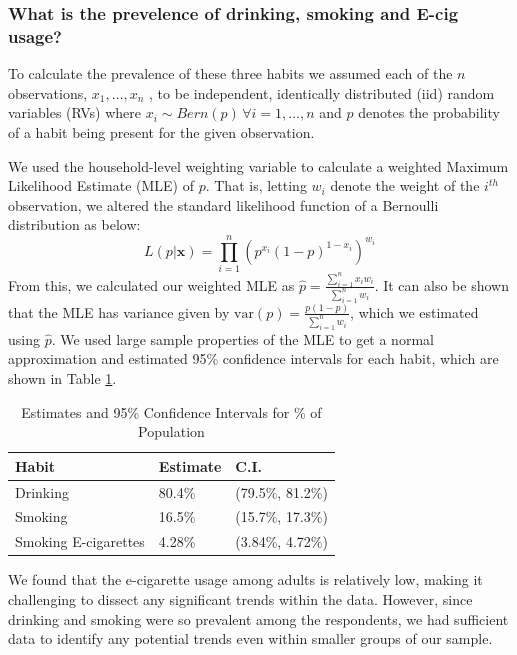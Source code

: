\documentclass[
  11pt,
  twocolumn]{article}
\begin{document}
\subsubsection{What is the prevelence of drinking, smoking and E-cig
usage?}\label{what-is-the-prevelence-of-drinking-smoking-and-e-cig-usage}

To calculate the prevalence of these three habits we assumed each of the
\(n\) observations, \(x_1,…,x_n\) , to be independent, identically
distributed (iid) random variables (RVs) where
\(x_i \sim Bern(p)\, \forall i=1,…,n\) and \(p\) denotes the probability
of a habit being present for the given observation.

We used the household-level weighting variable to calculate a weighted
Maximum Likelihood Estimate (MLE) of \(p\). That is, letting \(w_i\)
denote the weight of the \(i^{th}\) observation, we altered the standard
likelihood function of a Bernoulli distribution as below:
\[L(p|\textbf{x}) = \prod_{i = 1}^{n} (p^{x_i}(1-p)^{1-x_i})^{w_i}\]
From this, we calculated our weighted MLE as
\(\widehat{p} = \frac{\sum_{i=1}^{n} x_iw_i}{\sum_{i=1}^{n} w_i}\). It
can also be shown that the MLE has variance given by
\(\text{var}(p)=\frac{p(1-p)}{\sum_{i=1}^{n}w_i}\), which we estimated
using \(\widehat{p}\). We used large sample properties of the MLE to get
a normal approximation and estimated 95\% confidence intervals for each
habit, which are shown in Table \ref{tab:output-estimates-table}.

\begin{table}
\centering
\caption{\label{tab:outputestimatestable}Estimates and 95\% Confidence Intervals for \% of Population\label{tab:output-estimates-table}}
\centering
\fontsize{9}{11}\selectfont
\begin{tabular}[t]{l|l|l}
\hline
\textbf{Habit} & \textbf{Estimate} & \textbf{C.I.}\\
\hline
Drinking & 80.4\% & (79.5\%, 81.2\%)\\
\hline
Smoking & 16.5\% & (15.7\%, 17.3\%)\\
\hline
Smoking E-cigarettes & 4.28\% & (3.84\%, 4.72\%)\\
\hline
\end{tabular}
\end{table}

We found that the e-cigarette usage among adults is relatively low,
making it challenging to dissect any significant trends within the data.
However, since drinking and smoking were so prevalent among the
respondents, we had sufficient data to identify any potential trends
even within smaller groups of our sample.
\end{document}
